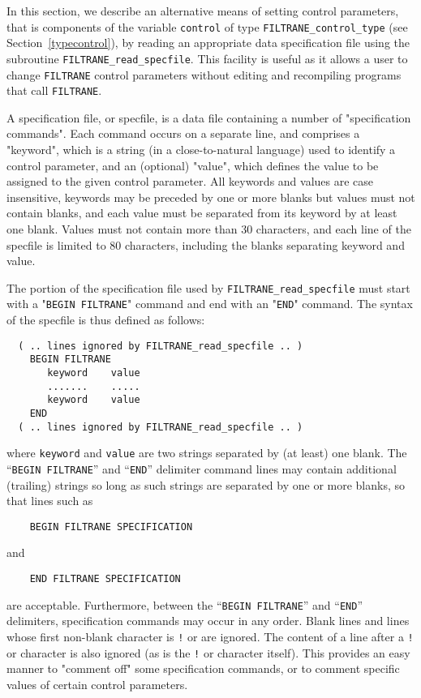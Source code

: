 \documentclass{galahad}
\newcommand{\packagename}{FILTRANE}
\begin{document}

\galfeatures
\noindent In this section, we describe an alternative means of setting
control parameters, that is components of the variable {\tt control} of type
{\tt \packagename\_control\_type}
(see Section~\ref{typecontrol}),
by reading an appropriate data specification file using the
subroutine {\tt \packagename\_read\_specfile}. This facility
is useful as it allows a user to change  {\tt \packagename} control parameters
without editing and recompiling programs that call {\tt \packagename}.

A specification file, or specfile, is a data file containing a number of
"specification commands". Each command occurs on a separate line,
and comprises a "keyword",
which is a string (in a close-to-natural language) used to identify a
control parameter, and
an (optional) "value", which defines the value to be assigned to the given
control parameter. All keywords and values are case insensitive,
keywords may be preceded by one or more blanks but
values must not contain blanks, and
each value must be separated from its keyword by at least one blank.
Values must not contain more than 30 characters, and
each line of the specfile is limited to 80 characters,
including the blanks separating keyword and value.

The portion of the specification file used by {\tt \packagename\_read\_specfile}
must start with a "{\tt BEGIN \packagename}" command and end with an
"{\tt END}" command.  The syntax of the specfile is thus defined as follows:
\begin{verbatim}
  ( .. lines ignored by FILTRANE_read_specfile .. )
    BEGIN FILTRANE
       keyword    value
       .......    .....
       keyword    value
    END
  ( .. lines ignored by FILTRANE_read_specfile .. )
\end{verbatim}
where {\tt keyword} and {\tt value} are two strings separated by (at least) one
blank. The ``{\tt BEGIN \packagename}'' and ``{\tt END}'' delimiter command
lines  may contain additional (trailing) strings so long as such strings are
separated by one or more blanks, so that lines such as
\begin{verbatim}
    BEGIN FILTRANE SPECIFICATION
\end{verbatim}
and
\begin{verbatim}
    END FILTRANE SPECIFICATION
\end{verbatim}
are acceptable. Furthermore, between the
``{\tt BEGIN \packagename}'' and ``{\tt END}'' delimiters,
specification commands may occur in any order.  Blank lines and
lines whose first non-blank character is {\tt !} or {\tt *} are ignored.
The content of a line after a {\tt !} or {\tt *} character is also
ignored (as is the {\tt !} or {\tt *}
character itself). This provides an easy manner to "comment off" some
specification commands, or to comment specific values
of certain control parameters.
\end{document}

